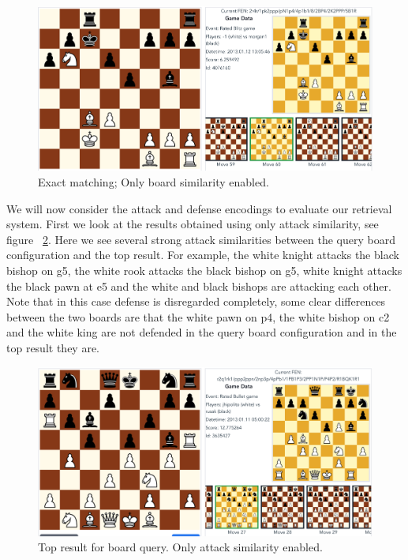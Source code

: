 \documentclass[11pt]{article}
\begin{document}
    \begin{figure}[H]
        \centering
        \includegraphics[width=12cm]{images/ExactMatch4-At}
        \caption{Exact matching; Only board similarity enabled.}
        \label{fig:ExactMatch4-At}
    \end{figure}

    We will now consider the attack and defense encodings to evaluate our retrieval system. First we look at the results obtained using only attack similarity, see figure ~\ref{fig:Attack}.
    Here we see several strong attack similarities between the query board configuration and the top result. For example, the white knight attacks the black bishop on g5, the white rook attacks the black bishop on g5, white knight attacks the black pawn at e5 and the white and black bishops are attacking each other.
    Note that in this case defense is disregarded completely, some clear differences between the two boards are that the white pawn on p4, the white bishop on c2 and the white king are not defended in the query board configuration and in the top result they are.

    \begin{figure}[H]
        \centering
        \includegraphics[width=12cm]{images/Attack}
        \caption{Top result for board query. Only attack similarity enabled.}
        \label{fig:Attack}
    \end{figure}
\end{document}
